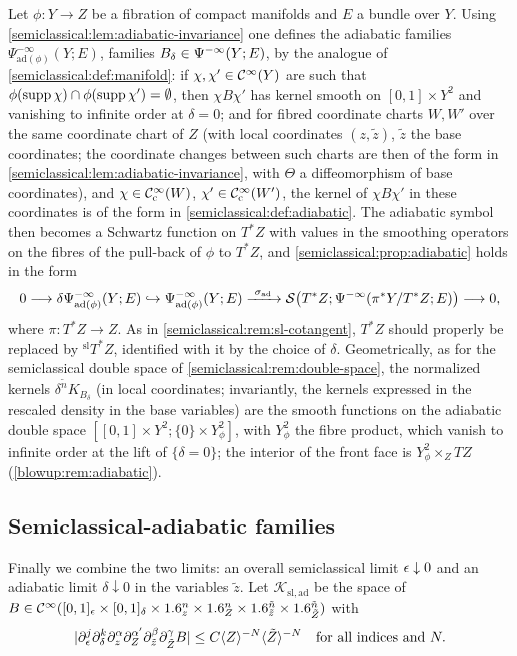 \begin{remark}[Fibrations]\label{semiclassical:rem:adiabatic-fibration}
  Let $\phi:Y\to Z$ be a fibration of compact manifolds and $E$ a bundle over $Y$.
  Using \cref{semiclassical:lem:adiabatic-invariance} one defines the adiabatic
  families $\Psi^{-\infty}_{\mathrm{ad}(\phi)}(Y;E)$, families $B_\delta\in\Psi^{-\infty}(Y;E)$,
  by the analogue of \cref{semiclassical:def:manifold}: if $\chi,\chi'\in\mathcal{C}^\infty(Y)$ are such
  that $\phi(\operatorname{supp}\chi)\cap\phi(\operatorname{supp}\chi')=\emptyset$, then $\chi B\chi'$ has kernel smooth on
  $[0,1]\times Y^2$ and vanishing to infinite order at $\delta=0$; and for fibred
  coordinate charts $W,W'$ over the same coordinate chart of $Z$ (with local
  coordinates $(z,\tilde z)$, $\tilde z$ the base coordinates; the coordinate changes between
  such charts are then of the form in \cref{semiclassical:lem:adiabatic-invariance}, with $\Theta$
  a diffeomorphism of base coordinates), and
  $\chi\in\mathcal{C}^\infty_{\mathrm{c}}(W)$, $\chi'\in\mathcal{C}^\infty_{\mathrm{c}}(W')$, the kernel of $\chi B\chi'$ in these coordinates is of
  the form in \cref{semiclassical:def:adiabatic}. The adiabatic symbol then becomes
  a Schwartz function on $T^*Z$ with values in the smoothing operators on the
  fibres of the pull-back of $\phi$ to $T^*Z$, and
  \cref{semiclassical:prop:adiabatic} holds in the form
  \begin{equation*}
    0\longrightarrow\delta\Psi^{-\infty}_{\mathrm{ad}(\phi)}(Y;E)\hookrightarrow
    \Psi^{-\infty}_{\mathrm{ad}(\phi)}(Y;E)\xrightarrow{\ \sigma_{\mathrm{ad}}\ }
    \mathcal{S}\bigl(T^*Z;\Psi^{-\infty}(\pi^*Y/T^*Z;E)\bigr)\longrightarrow0,
  \end{equation*}
  where $\pi:T^*Z\to Z$. As in \cref{semiclassical:rem:sl-cotangent}, $T^*Z$ should
  properly be replaced by ${}^{\mathrm{sl}}T^*Z$, identified with it by the choice of
  $\delta$. Geometrically, as for the semiclassical double space of
  \cref{semiclassical:rem:double-space}, the normalized kernels $\delta^{\tilde n}K_{B_\delta}$ (in
  local coordinates; invariantly, the kernels expressed in the rescaled density in the
  base variables) are the smooth functions on the
  adiabatic double space $[[0,1]\times Y^2;\{0\}\times Y^2_\phi]$, with $Y^2_\phi$ the fibre
  product, which vanish to infinite order at the lift of $\{\delta=0\}$; the interior of
  the front face is $Y^2_\phi\times_ZTZ$ (\cref{blowup:rem:adiabatic}).
\end{remark}

\subsection{Semiclassical-adiabatic families}
Finally we combine the two limits: an overall semiclassical limit $\epsilon\downarrow0$
and an adiabatic limit $\delta\downarrow0$ in the variables $\tilde z$. Let
$\mathcal K_{\mathrm{sl,ad}}$ be the space of
$B\in\mathcal{C}^\infty([0,1]_\epsilon\times[0,1]_\delta\times1.6^n_z\times1.6^n_Z\times1.6^{\tilde n}_{\tilde z}\times1.6^{\tilde n}_{\tilde Z})$
with
\begin{equation*}
  \lvert \partial^j_\epsilon\partial^k_\delta\partial^\alpha_z\partial^{\alpha'}_Z\partial^\beta_{\tilde z}\partial^\gamma_{\tilde Z}B\rvert\le C\langle Z\rangle^{-N}\langle \tilde Z\rangle^{-N}
  \quad\text{for all indices and }N.
\end{equation*}

